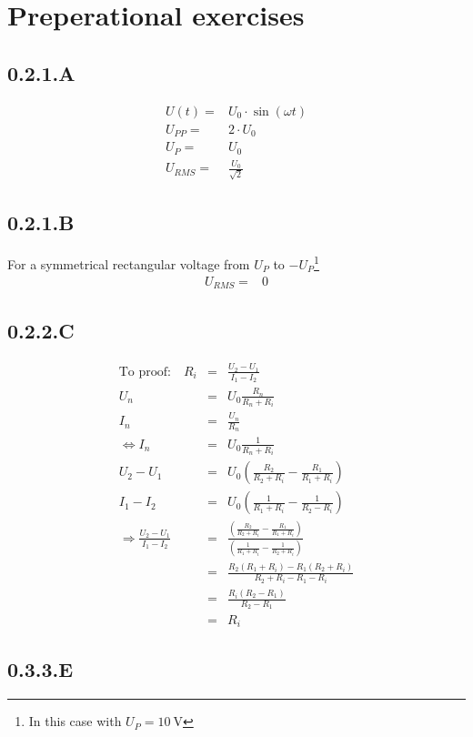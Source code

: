 \section{Preperational exercises}
\subsection*{0.2.1.A}
\begin{eqnarray*}
U(t)=&U_0\cdot\sin(\omega t)\\
U_{PP}=&2\cdot U_0\\
U_P=&U_0\\
U_{RMS}=&\frac{U_0}{\sqrt{2}}
\end{eqnarray*}
\subsection*{0.2.1.B}
For a symmetrical rectangular voltage from $U_P$ to $-U_P$\footnote{In this case with $U_P=\SI{10}{\volt}$} 
\begin{eqnarray*}
	U_{RMS}=&0
\end{eqnarray*}
\subsection*{0.2.2.C}
\begin{eqnarray*}
	\text{To proof:} \quad R_i&=&\frac{U_2-U_1}{I_1-I_2}\\
	U_n&=&U_0\frac{R_n}{R_n+R_i}\\
	I_n&=&\frac{U_n}{R_n}\\
	\Leftrightarrow I_n&=&U_0\frac{1}{R_n+R_i}\\
	U_2-U_1&=&U_0\left(\frac{R_2}{R_2+R_i}-\frac{R_1}{R_1+R_i}\right)\\
	I_1-I_2&=&U_0\left(\frac{1}{R_1+R_i}-\frac{1}{R_2-R_i}\right)\\
	\Rightarrow\frac{U_2-U_1}{I_1-I_2}&=&\frac{\left(\frac{R_2}{R_2+R_i}-\frac{R_1}{R_1+R_i}\right)}{\left(\frac{1}{R_1+R_i}-\frac{1}{R_2+R_i}\right)}\\
	&=&\frac{R_2\left(R_1+R_i\right)-R_1\left(R_2+R_i\right)}{R_2+R_i-R_1-R_i}\\
	&=&\frac{R_i\left(R_2-R_1\right)}{R_2-R_1}\\
	&=&R_i
\end{eqnarray*}
\newpage
\subsection*{0.3.3.E}